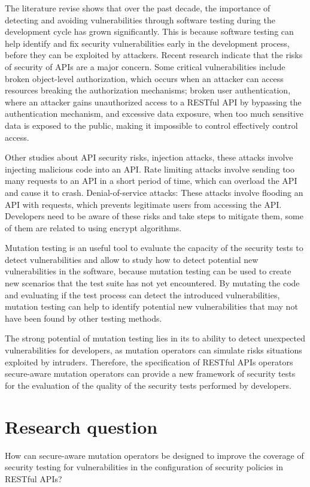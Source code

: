 The literature revise shows that over the past decade, the importance of detecting and avoiding vulnerabilities through software testing\cite{8564344} during the development cycle has grown significantly.  This is because software testing can help identify and fix security vulnerabilities early in the development process, before they can be exploited by attackers. Recent research indicate that the risks of security of APIs are a major concern. Some critical vulnerabilities include broken object-level authorization, which occurs when an attacker can access resources breaking the authorization mechanisms; broken user authentication, where an attacker gains unauthorized access to a RESTful API by bypassing the authentication mechanism, and excessive data exposure, when too much sensitive data is exposed to the public, making it impossible to control effectively control access.

Other studies about API security risks\cite{zenodo}, injection attacks, these attacks involve injecting malicious code into an API. Rate limiting attacks involve sending too many requests to an API in a short period of time, which can overload the API and cause it to crash. Denial-of-service attacks: These attacks involve flooding an API with requests, which prevents legitimate users from accessing the API. Developers need to be aware of these risks and take steps to mitigate them, some of them are related to using encrypt algorithms.

Mutation testing is an useful tool to evaluate the capacity of the security tests to detect vulnerabilities and allow to study how to detect potential new vulnerabilities in the software, because mutation testing can be used to create new scenarios that the test suite has not yet encountered. By mutating the code and evaluating if the test process can detect the introduced vulnerabilities, mutation testing can help to identify potential new vulnerabilities that may not have been found by other testing methods.

The strong potential of mutation testing lies in its to ability to detect unexpected vulnerabilities for developers, as mutation operators can simulate risks situations exploited by intruders. Therefore, the specification of RESTful APIs operators secure-aware mutation operators can provide a new framework of security tests for the evaluation of the quality of the security tests performed by developers.

\section{Research question}

  How can secure-aware mutation operators be designed to improve the coverage of security testing for vulnerabilities in the configuration of security policies in RESTful APIs?
